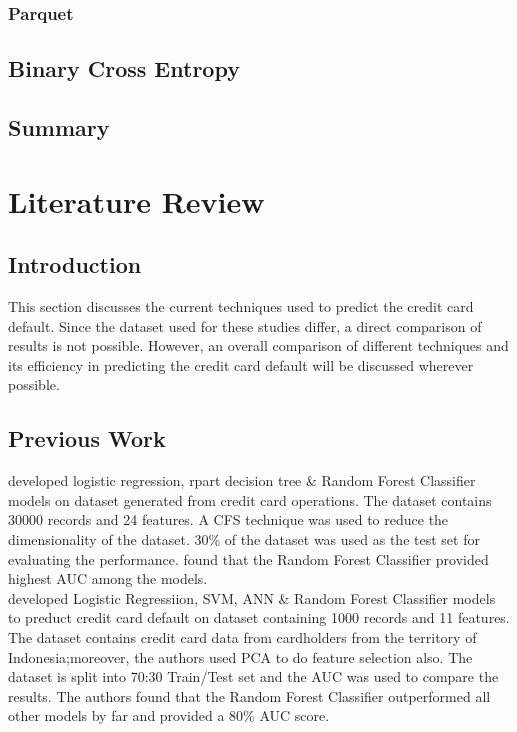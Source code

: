 \documentclass[twoside,11pt,a4paper]{article}
\begin{document}
\subsubsection{Parquet}
\subsection{Binary Cross Entropy}
\subsection{Summary}

\section{Literature Review}\label{sec:literature_review}
\subsection{Introduction}
This section discusses the current techniques used to predict the credit card default. Since the dataset used for these studies differ, a direct comparison of results is not possible. However, an overall comparison of different techniques and its efficiency in predicting the credit card default will be discussed wherever possible.

\subsection{Previous Work}
\citep{sayjadah2018credit} developed logistic regression, rpart decision tree \& Random Forest Classifier models on dataset generated from credit card operations. The dataset contains 30000 records and 24 features. A \acf{CFS} technique was used to reduce the dimensionality of the dataset. 30\% of the dataset was used as the test set for evaluating the performance. \citep{sayjadah2018credit} found that the Random Forest Classifier provided highest \acf{AUC} among the models.\\

\citep{widyadhanacredit} developed Logistic Regressiion, \acs{SVM}, \acs{ANN} \& Random Forest Classifier models to preduct credit card default on dataset containing 1000 records and 11 features. The dataset contains credit card data from cardholders from the territory of Indonesia;moreover, the authors used \acf{PCA} to do feature selection also. The dataset is split into 70:30 Train/Test set and the \acs{AUC} was used to compare the results. The authors found that the Random Forest Classifier outperformed all other models by far and provided a 80\% \acs{AUC} score.\\
\end{document}
